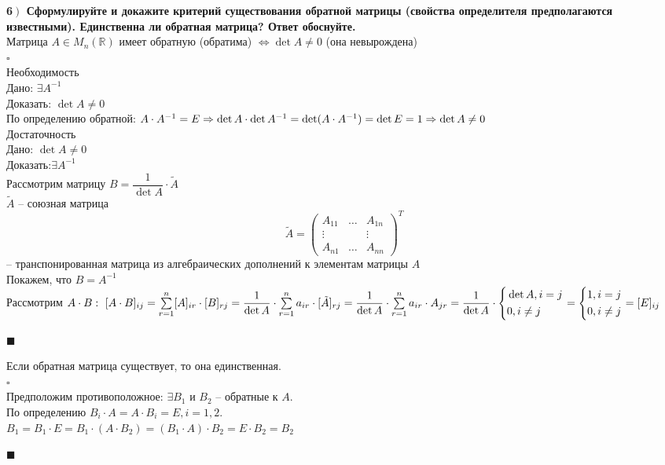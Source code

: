 \documentclass[a4paper,12pt]{article}
\newcommand*{\hm}[1]{#1\nobreak\discretionary{}
{\hbox{$\mathsurround=0pt #1$}}{}}
\begin{document}
    \textbf{6$\left.\right)$ Сформулируйте и докажите критерий существования обратной матрицы (свойства определителя предполагаются известными). Единственна ли обратная матрица? Ответ обоснуйте.}\\Матрица $A\in M_n(\mathbb{R})$ имеет обратную (обратима) $\Leftrightarrow\det A\ne0$ (она невырождена)\\
    $\square$\\
    Необходимость\\
    Дано: $\exists A^{-1}$\\
    Доказать: $\det A\ne0$\\
    По определению обратной: $A\cdot A^{-1}=E\Rightarrow\det A\cdot\det A^{-1}=\det(A\cdot A^{-1})\hm{=}\det E=1\Rightarrow\det A\ne0$\\
    Достаточность\\
    Дано: $\det A\ne0$\\
    Доказать:$\exists A^{-1}$\\
    Рассмотрим матрицу $B=\dfrac{1}{\det A}\cdot \tilde A$\\
    $\tilde A$ -- союзная матрица\\
    \[
        \tilde A=\begin{pmatrix}
                     A_{11} & \ldots & A_{1n} \\
                     \vdots &        & \vdots \\
                     A_{n1} & \ldots & A_{nn}
        \end{pmatrix}^T
    \]
    -- транспонированная матрица из алгебраических дополнений к элементам матрицы $A$\\
    Покажем, что $B=A^{-1}$\\
    Рассмотрим $A\cdot B: \text{ } [A\cdot B]_{ij}=\sum\limits_{r=1}^n [A]_{ir}\cdot [B]_{rj}=\dfrac{1}{\det A}\cdot \sum\limits_{r=1}^n a_{ir}\cdot[\tilde A]_{rj}\hm{=}\dfrac{1}{\det A}\cdot\sum\limits_{r=1}^n a_{ir}\cdot A_{jr}\hm{=}\dfrac{1}{\det A}\cdot\left\{
    \begin{aligned}
        &\det A, i=j\\
        &0, i\ne j
    \end{aligned}\right.=\left\{
    \begin{aligned}
        &1, i=j\\
        &0, i\ne j
    \end{aligned}\right.=[E]_{ij}$
    \begin{flushright}
        $\blacksquare$
    \end{flushright}
    Если обратная матрица существует, то она единственная.\\
    $\square$\\
    Предположим противоположное: $\exists B_1$ и $B_2$ -- обратные к $A$.\\ По определению $B_i\cdot A=A\cdot B_i=E, i=1,2.$\\
    $B_1=B_1\cdot E=B_1\cdot(A\cdot B_2)=(B_1\cdot A)\cdot B_2=E\cdot B_2=B_2$
    \begin{flushright}
        $\blacksquare$
    \end{flushright}
\end{document}
